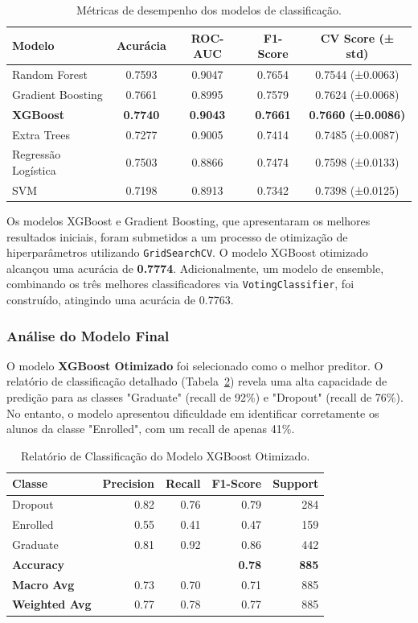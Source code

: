 \documentclass[12pt]{article}
\begin{document}
\begin{table}[h!]
\centering
\caption{Métricas de desempenho dos modelos de classificação.}
\label{tab:modelos}
\begin{tabular}{@{}lcccc@{}}
\toprule
\textbf{Modelo} & \textbf{Acurácia} & \textbf{ROC-AUC} & \textbf{F1-Score} & \textbf{CV Score (± std)} \\
\midrule
Random Forest      & 0.7593 & 0.9047 & 0.7654 & 0.7544 (±0.0063) \\
Gradient Boosting  & 0.7661 & 0.8995 & 0.7579 & 0.7624 (±0.0068) \\
\textbf{XGBoost}   & \textbf{0.7740} & \textbf{0.9043} & \textbf{0.7661} & \textbf{0.7660 (±0.0086)} \\
Extra Trees        & 0.7277 & 0.9005 & 0.7414 & 0.7485 (±0.0087) \\
Regressão Logística & 0.7503 & 0.8866 & 0.7474 & 0.7598 (±0.0133) \\
SVM                & 0.7198 & 0.8913 & 0.7342 & 0.7398 (±0.0125) \\
\bottomrule
\end{tabular}
\end{table}

Os modelos XGBoost e Gradient Boosting, que apresentaram os melhores resultados iniciais, foram submetidos a um processo de otimização de hiperparâmetros utilizando \texttt{GridSearchCV}. O modelo XGBoost otimizado alcançou uma acurácia de \textbf{0.7774}. Adicionalmente, um modelo de ensemble, combinando os três melhores classificadores via \texttt{VotingClassifier}, foi construído, atingindo uma acurácia de 0.7763.

\subsubsection{Análise do Modelo Final}
O modelo \textbf{XGBoost Otimizado} foi selecionado como o melhor preditor. O relatório de classificação detalhado (Tabela~\ref{tab:class_report}) revela uma alta capacidade de predição para as classes "Graduate" (recall de 92\%) e "Dropout" (recall de 76\%). No entanto, o modelo apresentou dificuldade em identificar corretamente os alunos da classe "Enrolled", com um recall de apenas 41\%.

\begin{table}[h!]
\centering
\caption{Relatório de Classificação do Modelo XGBoost Otimizado.}
\label{tab:class_report}
\begin{tabular}{lrrrr}
\toprule
\textbf{Classe} & \textbf{Precision} & \textbf{Recall} & \textbf{F1-Score} & \textbf{Support} \\
\midrule
Dropout    & 0.82 & 0.76 & 0.79 & 284 \\
Enrolled   & 0.55 & 0.41 & 0.47 & 159 \\
Graduate   & 0.81 & 0.92 & 0.86 & 442 \\
\midrule
\textbf{Accuracy} & & & \textbf{0.78} & \textbf{885} \\
\textbf{Macro Avg} & 0.73 & 0.70 & 0.71 & 885 \\
\textbf{Weighted Avg} & 0.77 & 0.78 & 0.77 & 885 \\
\bottomrule
\end{tabular}
\end{table}
\end{document}
